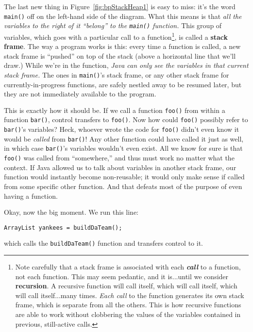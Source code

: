 The last new thing in Figure~\ref{fig:bpStackHeap1} is easy to miss: it's the
word \texttt{main()} off on the left-hand side of the diagram. What this means
is that \textit{all the variables to the right of it ``belong'' to the
\texttt{main()} function.} This group of variables, which goes with a
particular call to a function\footnote{Note carefully that a stack frame is
associated with each \textbf{\textit{call}} to a function, not each function.
This may seem pedantic, and it is...until we consider \textbf{recursion}. A
recursive function will call itself, which will call itself, which will call
itself...many times. \textit{Each call} to the function generates its own
stack frame, which is separate from all the others. This is how recursive
functions are able to work without clobbering the values of the variables
contained in previous, still-active calls.}, is called a \textbf{stack frame}.
The way a program works is this: every time a function is called, a new stack
frame is ``pushed'' on top of the stack (above a horizontal line that we'll
draw.) While we're in the function, \textit{Java can only see the variables in
that current stack frame.} The ones in \texttt{main()}'s stack frame, or any
other stack frame for currently-in-progress functions, are safely nestled away
to be resumed later, but they are not immediately available to the program.

This is exactly how it should be. If we call a function \texttt{foo()} from
within a function \texttt{bar()}, control transfers to \texttt{foo()}. Now how
could \texttt{foo()} possibly refer to \texttt{bar()}'s variables? Heck,
whoever wrote the code for \texttt{foo()} didn't even know it would be
\textit{called} from \texttt{bar()}! Any other function could have called it
just as well, in which case \texttt{bar()}'s variables wouldn't even exist.
All we know for sure is that \texttt{foo()} was called from ``somewhere,'' and
thus must work no matter what the context. If Java allowed us to talk about
variables in another stack frame, our function would instantly become
non-reusable; it would only make sense if called from some specific other
function. And that defeats most of the purpose of even having a function.

Okay, now the big moment. We run this line:

\begin{Verbatim}[fontsize=\small,samepage=true]
        ArrayList yankees = buildDaTeam();
\end{Verbatim}

which calls the \texttt{buildDaTeam()} function and transfers control to it.

